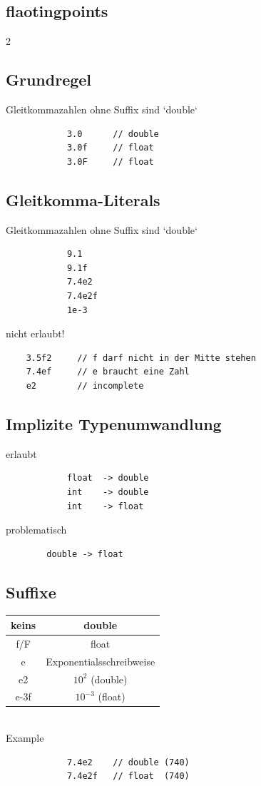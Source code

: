 \documentclass[a4paper,9pt]{article}
\begin{document}
    \subsection{flaotingpoints}
    
    \begin{multicols}{2}
        \subsection{Grundregel}
        Gleitkommazahlen ohne Suffix sind `double`
        \begin{lstlisting}
            3.0      // double
            3.0f     // float
            3.0F     // float
        \end{lstlisting}
        \subsection{Gleitkomma-Literals}
        Gleitkommazahlen ohne Suffix sind `double`
        \begin{lstlisting}
            9.1
            9.1f
            7.4e2
            7.4e2f
            1e-3
        \end{lstlisting}
        nicht erlaubt!
        \begin{lstlisting}
    3.5f2     // f darf nicht in der Mitte stehen
    7.4ef     // e braucht eine Zahl
    e2        // incomplete
        \end{lstlisting}
        \subsection{Implizite Typenumwandlung}
        erlaubt
        \begin{lstlisting}
            float  -> double  
            int    -> double   
            int    -> float    
        \end{lstlisting}
        problematisch
        \begin{lstlisting}
        double -> float 
        \end{lstlisting}
        \subsection{Suffixe}
        \begin{tabular}{|c|c|}
            \hline
            keins & double \\
            \hline
            f/F & float \\
            \hline
            e & Exponentialsschreibweise \\
            \hline
            e2 & $10^2$ (double)\\
            \hline
            e-3f & $10^{-3}$ (float) \\
            \hline
        \end{tabular}\\
        Example
        \begin{lstlisting}
            7.4e2    // double (740)
            7.4e2f   // float  (740)    
        \end{lstlisting}
    \end{multicols}
\end{document}
